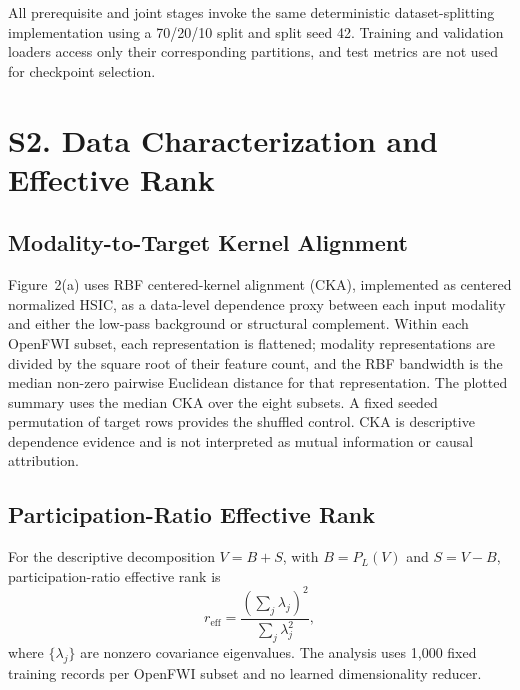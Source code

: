 \documentclass[11pt]{article}
\begin{document}
All prerequisite and joint stages invoke the same deterministic dataset-splitting implementation using a 70/20/10 split and split seed 42. Training and validation loaders access only their corresponding partitions, and test metrics are not used for checkpoint selection.

\section{S2. Data Characterization and Effective Rank}

\subsection{Modality-to-Target Kernel Alignment}

Figure~2(a) uses RBF centered-kernel alignment (CKA), implemented as centered normalized HSIC, as a data-level dependence proxy between each input modality and either the low-pass background or structural complement. Within each OpenFWI subset, each representation is flattened; modality representations are divided by the square root of their feature count, and the RBF bandwidth is the median non-zero pairwise Euclidean distance for that representation. The plotted summary uses the median CKA over the eight subsets. A fixed seeded permutation of target rows provides the shuffled control. CKA is descriptive dependence evidence and is not interpreted as mutual information or causal attribution.

\subsection{Participation-Ratio Effective Rank}

For the descriptive decomposition $V=B+S$, with $B=P_L(V)$ and $S=V-B$, participation-ratio effective rank is
\begin{equation}
r_{\mathrm{eff}}=
\frac{\left(\sum_j\lambda_j\right)^2}{\sum_j\lambda_j^2},
\end{equation}
where $\{\lambda_j\}$ are nonzero covariance eigenvalues. The analysis uses 1,000 fixed training records per OpenFWI subset and no learned dimensionality reducer.
\end{document}
